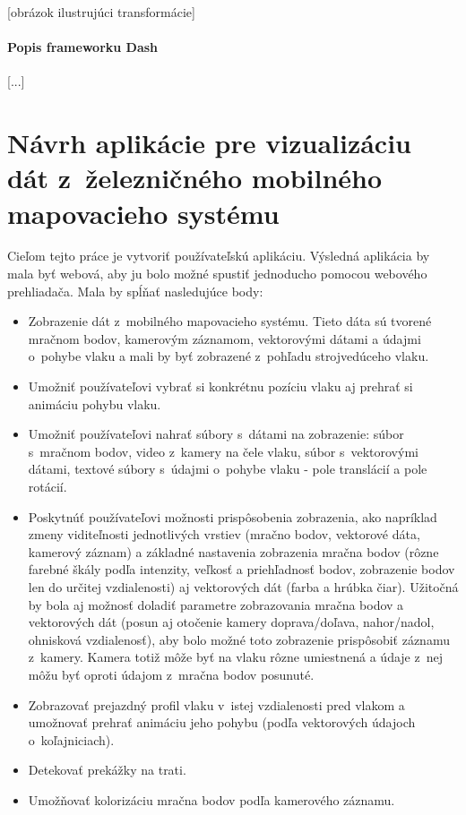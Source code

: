 [obrázok ilustrujúci transformácie]

\subsubsection{Popis frameworku Dash}

[...]

\chapter{Návrh aplikácie pre vizualizáciu dát z~železničného mobilného mapovacieho systému}

Cieľom tejto práce je vytvoriť používateľskú aplikáciu. Výsledná aplikácia by mala byť webová, aby ju bolo možné spustiť jednoducho pomocou webového prehliadača. Mala by spĺňať nasledujúce body:

\begin{itemize}
    \item Zobrazenie dát z~mobilného mapovacieho systému. Tieto dáta sú tvorené mračnom bodov, kamerovým záznamom, vektorovými dátami a údajmi o~pohybe vlaku a mali by byť zobrazené z~pohľadu strojvedúceho vlaku.
    \item Umožniť používateľovi vybrať si konkrétnu pozíciu vlaku aj prehrať si animáciu pohybu vlaku.
    \item Umožniť používateľovi nahrať súbory s~dátami na zobrazenie: súbor s~mračnom bodov, video z~kamery na čele vlaku, súbor s~vektorovými dátami, textové súbory s~údajmi o~pohybe vlaku - pole translácií a pole rotácií.
    \item Poskytnúť používateľovi možnosti prispôsobenia zobrazenia, ako napríklad zmeny viditeľnosti jednotlivých vrstiev (mračno bodov, vektorové dáta, kamerový záznam) a základné nastavenia zobrazenia mračna bodov (rôzne farebné škály podľa intenzity, veľkosť a priehľadnosť bodov, zobrazenie bodov len do určitej vzdialenosti) aj vektorových dát (farba a hrúbka čiar). Užitočná by bola aj možnosť doladiť parametre zobrazovania mračna bodov a vektorových dát (posun aj otočenie kamery doprava/doľava, nahor/nadol, ohnisková vzdialenosť), aby bolo možné toto zobrazenie prispôsobiť záznamu z~kamery. Kamera totiž môže byť na vlaku rôzne umiestnená a údaje z~nej môžu byť oproti údajom z~mračna bodov posunuté.
    \item Zobrazovať prejazdný profil vlaku v~istej vzdialenosti pred vlakom a umožnovať prehrať animáciu jeho pohybu (podľa vektorových údajoch o~koľajniciach).
    \item Detekovať prekážky na trati.
    \item Umožňovať kolorizáciu mračna bodov podľa kamerového záznamu.
\end{itemize}

